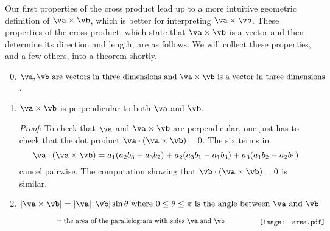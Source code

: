 Our first properties of the cross product 
lead up to a more intuitive geometric definition of $\va\times\vb$, which is better for interpreting $\va\times\vb$. 
 These properties of the cross product, which state that  $\va\times\vb$
is a vector and then determine its direction and length, are as follows.
We will collect these properties, and a few others, into a theorem shortly.
\begin{enumerate}[(1)]
\setcounter{enumi}{-1}
\item $\va,\vb\text{ are vectors in three dimensions and }
\va\times\vb\text{ is a vector in three dimensions}$.

\item $\va\times\vb$ is perpendicular to both  $\va$ and $\vb$.

\textit{Proof}: To check that $\va$ and $\va\times \vb$ are perpendicular, 
one just has to check that the dot product $\va\cdot(\va\times \vb)=0$.
The six terms in 
\begin{equation*}
\va\cdot(\va\times \vb)=
a_1(a_2b_3-a_3b_2)+a_2(a_3b_1-a_1b_3)+a_3(a_1b_2-a_2b_1)
\end{equation*} 
cancel pairwise. The computation showing that $\vb\cdot(\va\times \vb)=0$ 
is similar.

\bigskip
\item $|\va\times\vb|=|\va|\,|\vb|\sin\theta
\text{ where $0\le\theta\le\pi$ is the angle between $\va$ and $\vb$}$

$\phantom{|\va\times\vb|}=\text{the area of the parallelogram
with sides $\va$ and $\vb$}\qquad\qquad\quad
\smash{\raisebox{-0.2\height}{\texttt{[image: area.pdf]}}}$


\end{enumerate}
